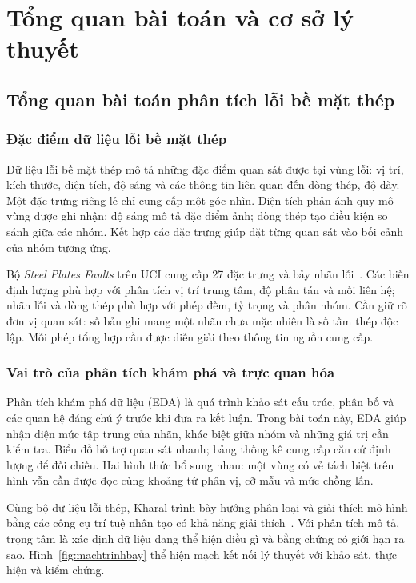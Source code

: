 \chapter{Tổng quan bài toán và cơ sở lý thuyết}
\label{chap:cosolythuyet}

\section{Tổng quan bài toán phân tích lỗi bề mặt thép}
\label{sec:tongquan}

\subsection{Đặc điểm dữ liệu lỗi bề mặt thép}

Dữ liệu lỗi bề mặt thép mô tả những đặc điểm quan sát được tại vùng lỗi: vị trí, kích thước, diện tích, độ sáng và các thông tin liên quan đến dòng thép, độ dày. Một đặc trưng riêng lẻ chỉ cung cấp một góc nhìn. Diện tích phản ánh quy mô vùng được ghi nhận; độ sáng mô tả đặc điểm ảnh; dòng thép tạo điều kiện so sánh giữa các nhóm. Kết hợp các đặc trưng giúp đặt từng quan sát vào bối cảnh của nhóm tương ứng.

Bộ \textit{Steel Plates Faults} trên UCI cung cấp 27 đặc trưng và bảy nhãn lỗi~\cite{uci}. Các biến định lượng phù hợp với phân tích vị trí trung tâm, độ phân tán và mối liên hệ; nhãn lỗi và dòng thép phù hợp với phép đếm, tỷ trọng và phân nhóm. Cần giữ rõ đơn vị quan sát: số bản ghi mang một nhãn chưa mặc nhiên là số tấm thép độc lập. Mỗi phép tổng hợp cần được diễn giải theo thông tin nguồn cung cấp.

\subsection{Vai trò của phân tích khám phá và trực quan hóa}

Phân tích khám phá dữ liệu (EDA) là quá trình khảo sát cấu trúc, phân bố và các quan hệ đáng chú ý trước khi đưa ra kết luận. Trong bài toán này, EDA giúp nhận diện mức tập trung của nhãn, khác biệt giữa nhóm và những giá trị cần kiểm tra. Biểu đồ hỗ trợ quan sát nhanh; bảng thống kê cung cấp căn cứ định lượng để đối chiếu. Hai hình thức bổ sung nhau: một vùng có vẻ tách biệt trên hình vẫn cần được đọc cùng khoảng tứ phân vị, cỡ mẫu và mức chồng lấn.

Cùng bộ dữ liệu lỗi thép, Kharal trình bày hướng phân loại và giải thích mô hình bằng các công cụ trí tuệ nhân tạo có khả năng giải thích~\cite{kharal}. Với phân tích mô tả, trọng tâm là xác định dữ liệu đang thể hiện điều gì và bằng chứng có giới hạn ra sao. Hình~\ref{fig:machtrinhbay} thể hiện mạch kết nối lý thuyết với khảo sát, thực hiện và kiểm chứng.

